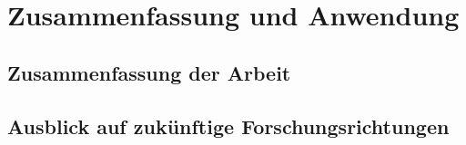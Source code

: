 \chapter{Zusammenfassung und Anwendung}
\section{Zusammenfassung der Arbeit}
\section{Ausblick auf zukünftige Forschungsrichtungen}